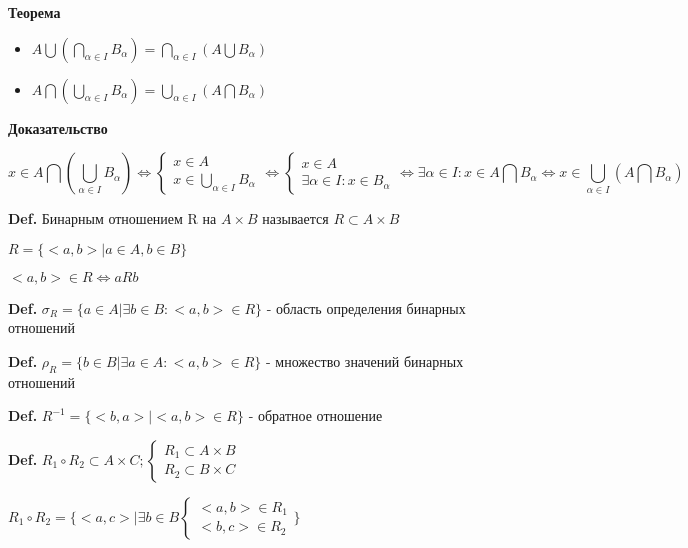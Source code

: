 \documentclass[14pt, letter paper]{article}
\begin{document}
\begin{center}\textbf{Теорема}\end{center}
\begin{itemize}
    \item $A \bigcup (\bigcap\limits_{\alpha \in I} B_\alpha) = \bigcap\limits_{\alpha \in I} (A \bigcup B_\alpha)$
    \item $A \bigcap (\bigcup\limits_{\alpha \in I} B_\alpha) = \bigcup\limits_{\alpha \in I} (A \bigcap B_\alpha)$
\end{itemize}

\begin{center}
    \textbf{Доказательство}
\end{center}

\[x \in A \bigcap (\bigcup\limits_{\alpha \in I} B_\alpha) \Leftrightarrow \begin{cases} x \in A \\ x \in \bigcup\limits_{\alpha \in I} B_\alpha \end{cases} \Leftrightarrow \begin{cases} x \in A \\ \exists \alpha \in I : x \in B_\alpha \end{cases} \Leftrightarrow \exists \alpha \in I : x \in A \bigcap B_\alpha \Leftrightarrow x \in \bigcup\limits_{\alpha \in I} (A \bigcap B_\alpha)\]

\textbf{Def.} Бинарным отношением R на $A \times B$ называется $R \subset A \times B$ \par
$R = \{<a, b> | a \in A, b \in B\}$ \par
$<a, b> \in R \Leftrightarrow aRb$

\textbf{Def.} $\sigma_R = \{a \in A | \exists b \in B : <a, b> \in R\}$ - область определения бинарных отношений

\textbf{Def.} $\rho_R = \{b \in B | \exists a \in A : <a, b> \in R\}$ - множество значений бинарных отношений

\textbf{Def.} $R^{-1} = \{<b, a> | <a, b> \in R\}$ - обратное отношение

\textbf{Def.} $R_1 \circ R_2 \subset A \times C; \begin{cases} R_1 \subset A \times B \\ R_2 \subset B \times C \end{cases}$ \par
$R_1 \circ R_2 = \{<a, c> | \exists b \in B \begin{cases} <a, b> \in R_1 \\ <b, c> \in R_2 \end{cases} \}$
\end{document}
